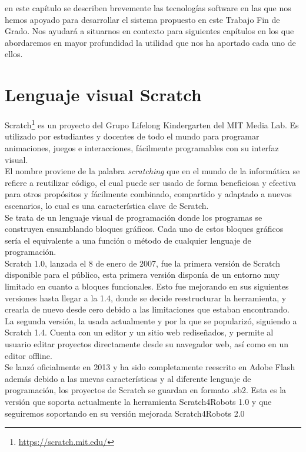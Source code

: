 en este capítulo se describen brevemente las tecnologías
software en las que nos hemos apoyado para desarrollar el sistema propuesto
en este Trabajo Fin de Grado. Nos ayudará a situarnos en contexto para siguientes capítulos en los que abordaremos en mayor profundidad la utilidad que nos ha aportado cada uno de ellos.

\section{Lenguaje visual Scratch}
\label{sec:scratch}
Scratch\footnote{\url{https://scratch.mit.edu/}} es un proyecto del Grupo Lifelong Kindergarten del MIT Media Lab.
Es utilizado por estudiantes y docentes de todo el mundo para programar animaciones, juegos e interacciones, fácilmente programables con su interfaz visual.\\

El nombre proviene de la palabra \textit{scratching} que en el mundo de la informática se refiere a reutilizar código, el cual puede ser usado de forma beneficiosa y efectiva para otros propósitos y fácilmente combinado, compartido y adaptado a nuevos escenarios, lo cual es una característica clave de Scratch.\\

Se trata de un lenguaje visual de programación donde los programas se construyen ensamblando bloques gráficos. Cada uno de estos bloques gráficos sería el equivalente a una función o método de cualquier lenguaje de programación.\\

Scratch 1.0, lanzada el 8 de enero de 2007, fue la primera versión de Scratch disponible para el público, esta primera versión disponía de un entorno muy limitado en cuanto a bloques funcionales. Esto fue mejorando en sus siguientes versiones hasta llegar a la 1.4, donde se decide reestructurar la herramienta, y crearla de nuevo desde cero debido a las limitaciones que estaban encontrando.\\

La segunda versión, la usada actualmente y por la que se popularizó, siguiendo a Scratch 1.4. Cuenta con un editor y un sitio web rediseñados, y permite al usuario editar proyectos directamente desde su navegador web, así como en un editor offline.\\

Se lanzó oficialmente en 2013 y ha sido completamente reescrito en Adobe Flash además debido a las nuevas características y al diferente lenguaje de programación, los proyectos de Scratch se guardan en formato .sb2. Esta es la versión que soporta actualmente la herramienta Scratch4Robots 1.0 y que seguiremos soportando en su versión mejorada Scratch4Robots 2.0\\

